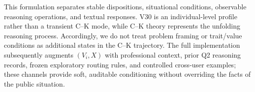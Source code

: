 This formulation separates stable dispositions, situational conditions, observable reasoning operations, and textual responses. V30 is an individual-level profile rather than a transient C--K mode, while C--K theory represents the unfolding reasoning process. Accordingly, we do not treat problem framing or trait/value conditions as additional states in the C--K trajectory. The full implementation subsequently augments $(V_i,X)$ with professional context, prior Q2 reasoning records, frozen exploratory routing rules, and controlled cross-user examples; these channels provide soft, auditable conditioning without overriding the facts of the public situation.
